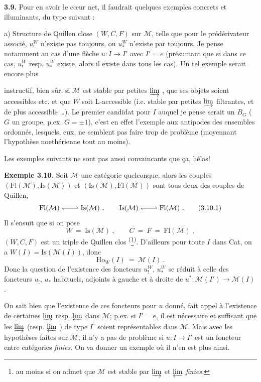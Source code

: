 \documentclass[11pt]{article}
\newcommand{\printedpage}[1]{\marginpar{\footnotesize p.~#1}}
\newcommand{\msp}[1]{\marginpar{\footnotesize [#1]}}
\newcommand{\M}{\mathcal{M}}
\newcommand{\Fl}{\mathrm{Fl}}
\newcommand{\Ho}{\mathrm{Ho}}
\newcommand{\qpair}{\mathrel{\leftharpoondown\joinrel\relbar\joinrel\rightharpoonup}}
\newcommand{\limind}{\varinjlim}
\newcommand{\limproj}{\varprojlim}
\newcommand{\Is}{\mathrm{Is}}
\begin{document}
\textbf{3.9.} Pour en avoir le cœur net, il faudrait quelques exemples concrets et illuminants, du type suivant :

a) Structure de Quillen close $(W,C,F)$ sur $\M$, telle que pour le prédérivateur associé, $u^{W}_{!}$ n'existe pas toujours, ou $u^{W}_{*}$ n'existe par toujours. Je pense notamment au cas d'une flèche $u : I\longrightarrow I'$ avec $I'=e$ (présumant que si dans ce cas, $u^{W}_{!}$ resp. $u^{W}_{*}$ existe, alors il existe dans tous les cas). Un tel exemple serait encore plus %

\printedpage{24}
\msp{page 43}
instructif, bien sûr, si $\mathcal{M}$ est stable par petites $\limind$ , que ses objets soient accessibles etc. et que $W$ soit L-accessible (i.e. stable par petites $\limind$ filtrantes, et de plus accessible \dots). Le premier candidat pour $I$ auquel je pense serait un $B_G$ ($G$ un groupe, p.ex. $G=\pm1$), c'est en effet l'exemple aux antipodes des ensembles ordonnés, lesquels, eux, ne semblent pas faire trop de problème (moyennant l'hypothèse noethérienne tout au moins).

Les exemples suivants ne sont pas aussi convaincants que ça, hélas!

\textbf{Exemple 3.10.} Soit $\mathcal{M}$ une catégorie quelconque, alors les couples $(\Fl(\mathcal{M}),\Is(\mathcal{M}))$ et $(\Is(\mathcal{M}),\Fl(\mathcal{M}))$ sont tous deux des couples de Quillen,
\[
\Fl(\mathcal{M}) \qpair \Is(\mathcal{M}) \ , \qquad \Is(\mathcal{M}) \qpair \Fl(\mathcal{M}) \ . \tag*{(3.10.1)} %
\]
Il s'ensuit que si on pose
\[
W \ = \ \Is(\mathcal{M}) \ , \qquad C \ = \ F \ = \ \Fl(\mathcal{M}) \ , \tag*{(3.10.2)}
\]
$(W,C,F)$ est un triple de Quillen clos \textsuperscript{(}\footnote[22]{au moins si on admet que $\mathcal{M}$ est stable par $\limind$ et $\limproj$ \textit{finies.}}\textsuperscript{)}. D'ailleurs pour toute $I$ dans Cat, on a $W(I)=\Is(\mathcal{M}(I))$, donc
\[
\Ho_W(I) \ = \ \mathcal{M}(I) \ . \tag*{(3.10.3)}
\]
Donc la question de l'existence des foncteurs $u_!^W$, $u_*^W$ se réduit à celle des foncteurs $u_!$, $u_*$ habituels, adjoints à gauche et à droite de $u^* : \mathcal{M}(I') \longrightarrow \mathcal{M}(I)$.

\msp{page 44}
On sait bien que l'existence de ces foncteurs pour $u$ donné, fait appel à l'existence de certaines $\limind$ resp. $\limproj$ dans $\mathcal{M}$; p.ex. si $I'=e$, il est nécessaire et suffisant que les $\limind$ (resp. $\limproj$ ) de type $I^\circ$ soient représentables dans $\mathcal{M}$. Mais avec les hypothèses faites sur $\mathcal{M}$, il n'y a pas de problème si $u : I \longrightarrow I'$ est un foncteur entre catégories \textit{finies.} On va donner un exemple où il n'en est plus ainsi.
\end{document}
